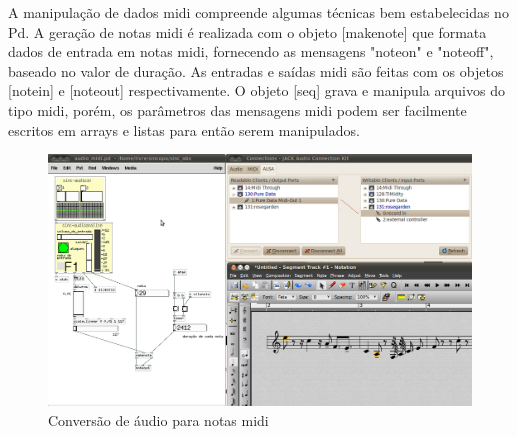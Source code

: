 \documentclass{ppgmus}
\begin{document}
% 
% 
% 
% 
% 
% 
% 
% 



A manipulação de dados midi compreende algumas técnicas bem estabelecidas
no Pd. A geração de notas midi é realizada com o objeto [makenote] que formata
dados de entrada em notas midi, fornecendo as mensagens "noteon" e "noteoff", baseado
no valor de duração. As entradas e saídas midi são feitas com os objetos
[notein] e [noteout] respectivamente. O objeto [seq] grava e manipula arquivos 
do tipo midi, porém, os parâmetros das mensagens midi podem ser facilmente escritos
em arrays e listas para então serem manipulados.

\begin{figure}
\includegraphics[scale=.4]{audio2midi}
\caption{Conversão de áudio para notas midi}
\label{audio2midi}
\end{figure}
\end{document}
